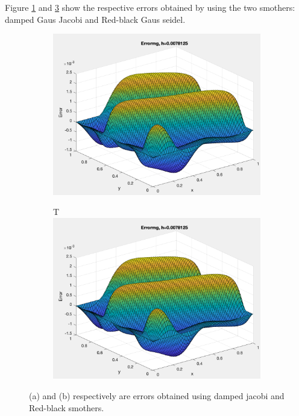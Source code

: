 \documentclass[12pt,a4paper]{article}
\begin{document}
		\noindent Figure \ref{fig:jerr} and \ref{fig:rderr} show the respective errors obtained by using the two smothers: damped Gaus Jacobi and Red-black Gaus seidel.
	
	\begin{figure}[h]
		\begin{subfigure}[b]{0.5\textwidth}
			\centering
			\includegraphics[width=1.0\linewidth]{"ej"}
			\caption{}
			\label{fig:jerr}
		\end{subfigure}
		\begin{subfigure}[b]{0.5\textwidth}T
			\centering
			\includegraphics[width=1.0\linewidth]{"er"}
			\caption{}
			\label{fig:rderr}
		\end{subfigure}
		\caption{(a) and (b) respectively are errors obtained using damped jacobi and Red-black smothers. }
	\end{figure}
	
\end{document}
